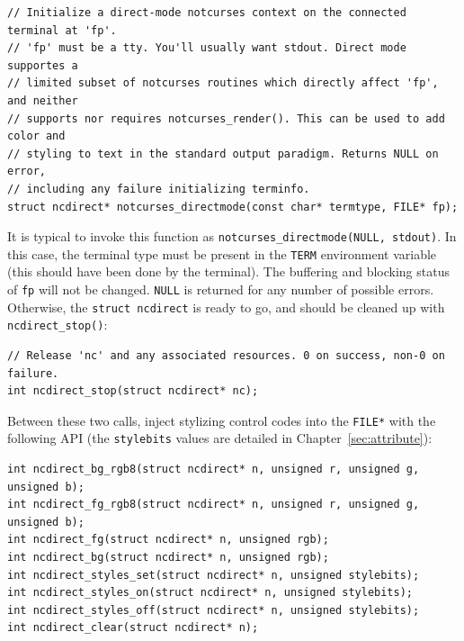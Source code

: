 \documentclass[letterpaper,10pt]{article}
\begin{document}
\begin{listing}[!htbp]
\begin{verbatim}
// Initialize a direct-mode notcurses context on the connected terminal at 'fp'.
// 'fp' must be a tty. You'll usually want stdout. Direct mode supportes a
// limited subset of notcurses routines which directly affect 'fp', and neither
// supports nor requires notcurses_render(). This can be used to add color and
// styling to text in the standard output paradigm. Returns NULL on error,
// including any failure initializing terminfo.
struct ncdirect* notcurses_directmode(const char* termtype, FILE* fp);
\end{verbatim}
\end{listing}

It is typical to invoke this function as \texttt{notcurses\_directmode(NULL, stdout)}.
In this case, the terminal type must be present in the \texttt{TERM} environment
variable (this should have been done by the terminal). The buffering and
blocking status of \texttt{fp} will not be changed. \texttt{NULL} is returned for any number
of possible errors. Otherwise, the \texttt{struct ncdirect} is ready to go, and should
be cleaned up with \texttt{ncdirect\_stop()}:

\begin{listing}[!htbp]
\begin{verbatim}
// Release 'nc' and any associated resources. 0 on success, non-0 on failure.
int ncdirect_stop(struct ncdirect* nc);
\end{verbatim}
\end{listing}

Between these two calls, inject stylizing control codes into the \texttt{FILE*} with
the following API (the \texttt{stylebits} values are detailed in Chapter~\ref{sec:attribute}):

\begin{listing}[!htbp]
\begin{verbatim}
int ncdirect_bg_rgb8(struct ncdirect* n, unsigned r, unsigned g, unsigned b);
int ncdirect_fg_rgb8(struct ncdirect* n, unsigned r, unsigned g, unsigned b);
int ncdirect_fg(struct ncdirect* n, unsigned rgb);
int ncdirect_bg(struct ncdirect* n, unsigned rgb);
int ncdirect_styles_set(struct ncdirect* n, unsigned stylebits);
int ncdirect_styles_on(struct ncdirect* n, unsigned stylebits);
int ncdirect_styles_off(struct ncdirect* n, unsigned stylebits);
int ncdirect_clear(struct ncdirect* n);
\end{verbatim}
\end{listing}
\end{document}

